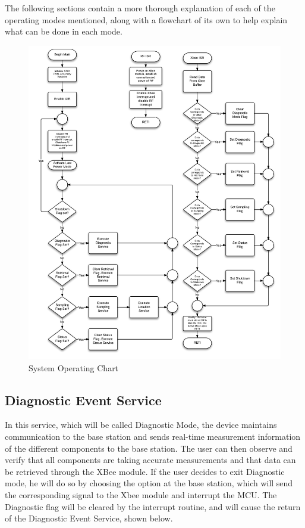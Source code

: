 The following sections contain a more thorough explanation of each of the operating modes mentioned, along with a flowchart of its own to help explain what can be done in each mode.
\begin{figure}[H]
	\centering
	\includegraphics[width=\textwidth]{img/SystemFlowchart}
	\caption{System Operating Chart \label{fig:systemFlowchart}}
\end{figure}

\subsection{Diagnostic Event Service}

In this service, which will be called Diagnostic Mode, the device maintains communication to the base station and sends real-time measurement information of the different components to the base station. The user can then observe and verify that all components are taking accurate measurements and that data can be retrieved through the XBee module. If the user decides to exit Diagnostic mode, he will do so by choosing the option at the base station, which will send the corresponding signal to the Xbee module and interrupt the MCU. The Diagnostic flag will be cleared by the interrupt routine, and will cause the return of the Diagnostic Event Service, shown below.


